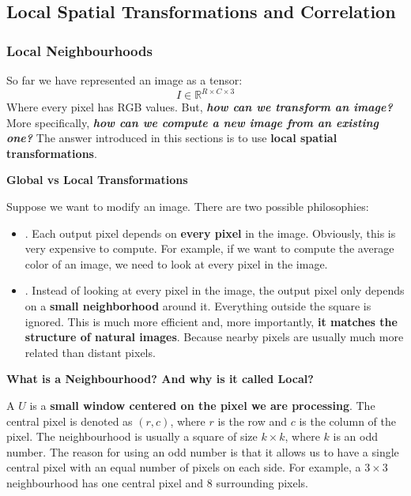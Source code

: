 \subsection{Local Spatial Transformations and Correlation}\label{sec:local-spatial-transformations-and-correlation}

\subsubsection{Local Neighbourhoods}\label{sec:local-neighbourhoods}

So far we have represented an image as a tensor:
\begin{equation*}
    I \in \mathbb{R}^{R \times C \times 3}
\end{equation*}
Where every pixel has RGB values. But, \textbf{\emph{how can we transform an image?}} More specifically, \textbf{\emph{how can we compute a new image from an existing one?}} The answer introduced in this sections is to use \textbf{local spatial transformations}.

\highspace
\begin{flushleft}
    \textcolor{Green3}{ \textbf{Global vs Local Transformations}}
\end{flushleft}
Suppose we want to modify an image. There are two possible philosophies:
\begin{itemize}
    \item {}. Each output pixel depends on \textbf{every pixel} in the image. Obviously, this is very expensive to compute. For example, if we want to compute the average color of an image, we need to look at every pixel in the image.
    \item {}. Instead of looking at every pixel in the image, the output pixel only depends on a \textbf{small neighborhood} around it. Everything outside the square is ignored. This is much more efficient and, more importantly, \textbf{it matches the structure of natural images}. Because nearby pixels are usually much more related than distant pixels.
\end{itemize}

\highspace
\begin{flushleft}
    \textcolor{Green3}{ \textbf{What is a Neighbourhood? And why is it called Local?}}
\end{flushleft}
A  $U$ is a \textbf{small window centered on the pixel we are processing}. The central pixel is denoted as $(r,c)$, where $r$ is the row and $c$ is the column of the pixel. The neighbourhood is usually a square of size $k \times k$, where $k$ is an odd number. The reason for using an odd number is that it allows us to have a single central pixel with an equal number of pixels on each side. For example, a $3 \times 3$ neighbourhood has one central pixel and 8 surrounding pixels.

